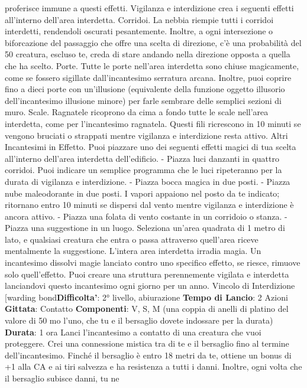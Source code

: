 \begin{multicols}{2}
proferisce immune a questi effetti.
Vigilanza e interdizione crea i seguenti effetti all’interno
dell’area interdetta.
Corridoi. La nebbia riempie tutti i corridoi interdetti,
rendendoli oscurati pesantemente. Inoltre, a ogni
intersezione o biforcazione del passaggio che offre una
scelta di direzione, c’è una probabilità del 50%
creatura, escluso te, creda di stare andando nella
direzione opposta a quella che ha scelto.
Porte. Tutte le porte nell’area interdetta sono chiuse
magicamente, come se fossero sigillate
dall’incantesimo serratura arcana. Inoltre, puoi coprire
fino a dieci porte con un’illusione (equivalente della
funzione oggetto illusorio dell’incantesimo illusione
minore) per farle sembrare delle semplici sezioni di
muro.
Scale. Ragnatele ricoprono da cima a fondo tutte le
scale nell’area interdetta, come per l’incantesimo
ragnatela. Questi fili ricrescono in 10 minuti se vengono
bruciati o strappati mentre vigilanza e interdizione resta
attivo.
Altri Incantesimi in Effetto. Puoi piazzare uno dei
seguenti effetti magici di tua scelta all’interno dell’area
interdetta dell’edificio.
- Piazza luci danzanti in quattro corridoi. Puoi indicare
un semplice programma che le luci ripeteranno per
la durata di vigilanza e interdizione.
- Piazza bocca magica in due posti.
- Piazza nube maleodorante in due posti. I vapori
appaiono nel posto da te indicato; ritornano entro 10
minuti se dispersi dal vento mentre vigilanza e
interdizione è ancora attivo.
- Piazza una folata di vento costante in un corridoio o
stanza.
- Piazza una suggestione in un luogo. Seleziona
un’area quadrata di 1 metro di lato, e qualsiasi
creatura che entra o passa attraverso quell’area
riceve mentalmente la suggestione.
L’intera area interdetta irradia magia. Un incantesimo
dissolvi magie lanciato contro uno specifico effetto, se
riesce, rimuove solo quell’effetto.
Puoi creare una struttura perennemente vigilata e
interdetta lanciandovi questo incantesimo ogni giorno
per un anno.
Vincolo di Interdizione
[warding bond\textbf{Difficolta'}:
2° livello, abiurazione
\textbf{Tempo di Lancio}: 2 Azioni
\textbf{Gittata}: Contatto
\textbf{Componenti}: V, S, M (una coppia di anelli di platino del
valore di 50 mo l’uno, che tu e il bersaglio dovete
indossare per la durata)
\textbf{Durata}: 1 ora
Lanci l’incantesimo a contatto di una creatura che vuoi
proteggere. Crei una connessione mistica tra di te e il
bersaglio fino al termine dell’incantesimo. Finché il
bersaglio è entro 18 metri da te, ottiene un bonus di +1
alla CA e ai tiri salvezza e ha resistenza a tutti i danni.
Inoltre, ogni volta che il bersaglio subisce danni, tu ne

\end{multicols}
